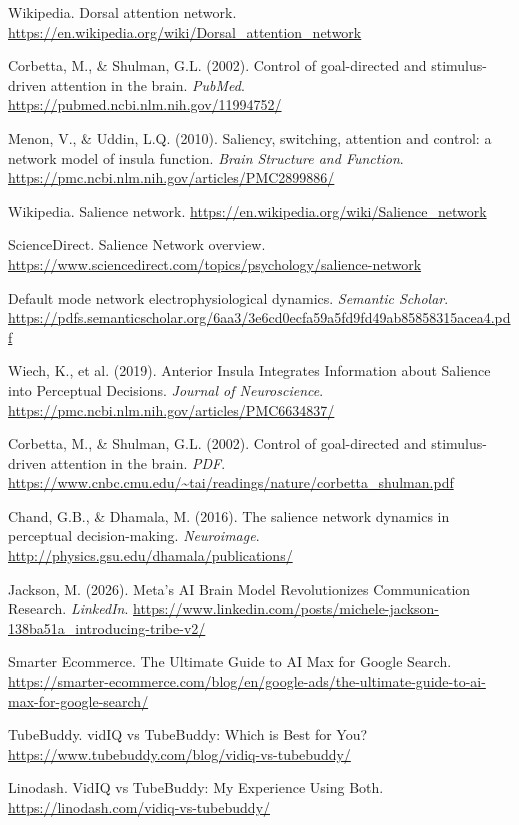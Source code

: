 \documentclass[11pt,letterpaper]{article}
\begin{document}
\begin{list}{}{\setlength{\leftmargin}{2em}\setlength{\itemindent}{-2em}\setlength{\itemsep}{2pt}}
\item[{[36]}] Wikipedia. Dorsal attention network. \url{https://en.wikipedia.org/wiki/Dorsal_attention_network}
\item[{[37]}] Corbetta, M., \& Shulman, G.L. (2002). Control of goal-directed and stimulus-driven attention in the brain. \textit{PubMed}. \url{https://pubmed.ncbi.nlm.nih.gov/11994752/}
\item[{[38]}] Menon, V., \& Uddin, L.Q. (2010). Saliency, switching, attention and control: a network model of insula function. \textit{Brain Structure and Function}. \url{https://pmc.ncbi.nlm.nih.gov/articles/PMC2899886/}
\item[{[39]}] Wikipedia. Salience network. \url{https://en.wikipedia.org/wiki/Salience_network}
\item[{[40]}] ScienceDirect. Salience Network overview. \url{https://www.sciencedirect.com/topics/psychology/salience-network}
\item[{[41]}] Default mode network electrophysiological dynamics. \textit{Semantic Scholar}. \url{https://pdfs.semanticscholar.org/6aa3/3e6cd0ecfa59a5fd9fd49ab85858315acea4.pdf}
\item[{[42]}] Wiech, K., et al. (2019). Anterior Insula Integrates Information about Salience into Perceptual Decisions. \textit{Journal of Neuroscience}. \url{https://pmc.ncbi.nlm.nih.gov/articles/PMC6634837/}
\item[{[43]}] Corbetta, M., \& Shulman, G.L. (2002). Control of goal-directed and stimulus-driven attention in the brain. \textit{PDF}. \url{https://www.cnbc.cmu.edu/~tai/readings/nature/corbetta_shulman.pdf}
\item[{[44]}] Chand, G.B., \& Dhamala, M. (2016). The salience network dynamics in perceptual decision-making. \textit{Neuroimage}. \url{http://physics.gsu.edu/dhamala/publications/}
\item[{[45]}] Jackson, M. (2026). Meta's AI Brain Model Revolutionizes Communication Research. \textit{LinkedIn}. \url{https://www.linkedin.com/posts/michele-jackson-138ba51a_introducing-tribe-v2/}
\item[{[46]}] Smarter Ecommerce. The Ultimate Guide to AI Max for Google Search. \url{https://smarter-ecommerce.com/blog/en/google-ads/the-ultimate-guide-to-ai-max-for-google-search/}
\item[{[47]}] TubeBuddy. vidIQ vs TubeBuddy: Which is Best for You? \url{https://www.tubebuddy.com/blog/vidiq-vs-tubebuddy/}
\item[{[48]}] Linodash. VidIQ vs TubeBuddy: My Experience Using Both. \url{https://linodash.com/vidiq-vs-tubebuddy/}

\end{list}
\end{document}
